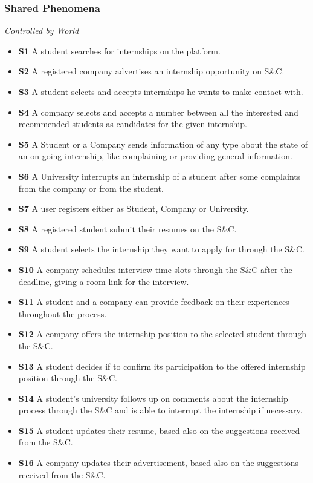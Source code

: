 \documentclass{article}
\begin{document}
\subsubsection{Shared Phenomena}
    \textit{Controlled by World}
    \begin{itemize}
        \item \textbf{S1} A student searches for internships on the platform.
        \item \textbf{S2} A registered company advertises an internship opportunity on S\&C.
        \item \textbf{S3} A student selects and accepts internships he wants to make contact with.
        \item \textbf{S4} A company selects and accepts a number between all the interested and recommended students as candidates for the given internship.
        \item \textbf{S5} A Student or a Company sends information of any type about the state of an on-going internship, like complaining or providing general information.
        \item \textbf{S6} A University interrupts an internship of a student after some complaints from the company or from the student. 
        \item \textbf{S7} A user registers either as Student, Company or University.
        
        \item \textbf{S8} A registered student submit their resumes on the S\&C.
        
        \item \textbf{S9} A student selects the internship they want to apply for through the S\&C.
        \item \textbf{S10} A company schedules interview time slots through the S\&C after the deadline, giving a room link for the interview.
        \item \textbf{S11} A student and a company can provide feedback on their experiences throughout the process.
        \item \textbf{S12} A company offers the internship position to the selected student through the S\&C.
        \item \textbf{S13} A student decides if to confirm its participation to the offered internship position through the S\&C.
        \item \textbf{S14} A student's university follows up on comments about the internship process through the S\&C and is able to interrupt the internship if necessary.
        \item \textbf{S15} A student updates their resume, based also on the suggestions received from the S\&C.
        \item \textbf{S16} A company updates their advertisement, based also on the suggestions received from the S\&C.
    \end{itemize}
\end{document}
